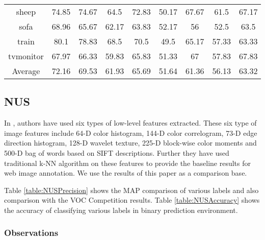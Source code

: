 \begin{sidewaystable}
\begin{tabular}{|c|c|c|c|c|c|c|c|c|}
sheep & 74.85 & 74.67 & 64.5 & 72.83 & 50.17 & 67.67 & 61.5 & 67.17\\  [1ex]
sofa & 68.96 & 65.67 & 62.17 & 63.83 & 52.17 & 56 & 52.5 & 63.5\\  [1ex]
train & 80.1 & 78.83 & 68.5 & 70.5 & 49.5 & 65.17 & 57.33 & 63.33\\  [1ex]
tvmonitor & 67.97 & 66.33 & 59.83 & 65.83 & 51.33 & 67 & 57.83 & 67.83\\  [1ex]  \hline 
Average & 72.16 & 69.53 & 61.93 & 65.69 & 51.64 & 61.36 & 56.13 & 63.32 \\  [1ex] \hline  
\end{tabular}
\label{table:PASCALAccuracy} %
\end{sidewaystable}




\subsection{NUS}
In \cite{NUS}, authors have used six types of low-level features extracted. These six type of image features include 64-D color histogram, 144-D color correlogram, 73-D edge direction histogram, 128-D wavelet texture, 225-D block-wise color moments and 500-D bag of words based on SIFT descriptions. Further they have used traditional k-NN algorithm  on these features to provide the baseline results for web image annotation. We use the results of this paper as a comparison base. 

Table \ref{table:NUSPrecision} shows the MAP comparison of various labels and also comparison with the VOC Competition results.
Table \ref{table:NUSAccuracy} shows the accuracy of classifying various labels in binary prediction environment.


\subsubsection*{Observations}

